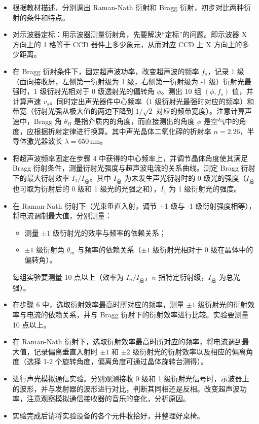 \documentclass[12pt,a4paper,UTF8]{ctexart}
\begin{document}
	\begin{itemize}
		\item 根据教材描述，分别调出 Raman-Nath 衍射和 Bragg 衍射，初步对比两种衍射的条件和特点。
		
		\item 对示波器定标：用示波器测量衍射角，先要解决“定标”的问题。即示波器 X 方向上的 1 格等于 CCD 器件上多少象元，从而对应 CCD 上 X 方向上的多少距离。
		
		\item 在 Bragg 衍射条件下，固定超声波功率，改变超声波的频率 \( f_s \)，记录 1 级（面向接收屏，左侧第一衍射级为 1 级，右侧第一衍射级为 -1 级）衍射光最强时，1 级衍射光相对于 0 级透射光的偏转角 \(\phi\)。测出 10 组 \( (\phi, f_s) \) 值，并计算声速 \( v_s \)。同时定出声光器件中心频率（1 级衍射光最强时对应的频率）和带宽（衍射光强从极大值的两边下降到 \( 1/\sqrt{2} \) 对应的频带宽度）。注意计算声速中，Bragg 角 \( \theta_B \) 是指介质内的角度，而直接测出的角度 \( \phi \) 是空气中的角度，应根据折射定律进行换算。其中声光晶体二氧化碲的折射率 \( n = 2.26 \)，半导体激光器波长 \( \lambda = 650\,\text{nm} \)。
		
		\item 将超声波频率固定在步骤 4 中获得的中心频率上，并调节晶体角度使其满足 Bragg 衍射条件，测量衍射光强度与超声波电流的关系曲线。测定 Bragg 衍射下的最大衍射效率 \( I_1/I_{\text{总}} \)。其中 \( I_{\text{总}} \) 为未发生声光衍射时的 0 级光的强度（\( I_{\text{总}} \) 也可取为衍射后的 0 级和 1 级光的光强之和），\( I_1 \) 为 1 级衍射光的强度。
		
		\item 在 Raman-Nath 衍射下（光束垂直入射，调节 +1 级与 -1 级衍射强度相等），将电流调制最大值，分别测量：
		
		\begin{itemize}
			\item 测量 \( \pm 1 \) 级衍射光的效率与频率的依赖关系；
			\item \( \pm 1 \) 级衍射角 \( \theta_m \) 与频率的依赖关系（\( \pm 1 \) 级衍射光相对于 0 级在晶体中的偏转角）。
		\end{itemize}

		每组实验要测量 10 点以上（效率为 \( I_n/I_{\text{总}} \)，\( n \) 指特定衍射级，\( I_{\text{总}} \) 为总光强）。
		
		\item 在步骤 6 中，选取衍射效率最高时所对应的频率，测量 \( \pm 1 \) 级衍射光的衍射效率与电流的依赖关系，并与 Bragg 衍射下的衍射效率进行比较。实验要测量 10 点以上。
		
		\item 在 Raman-Nath 衍射下，选取衍射效率最高时所对应的频率，将电流调到最大值，记录偏离垂直入射时 \( \pm 1 \) 和 \( \pm 2 \) 级衍射光的衍射效率以及相应的偏离角度（选择 1-2 个旋转角度，偏离角度可通过晶体旋转台测得）。
		
		\item 进行声光模拟通信实验。分别观测接收 0 级和 1 级衍射光信号时，示波器上的波形，并与发射器的波形进行对比，判断其同相还是反相。改变超声波功率，注意观察模拟通信接收器的音乐的变化，分析原因。
		
		\item 实验完成后请将实验设备的各个元件收拾好，并整理好桌椅。
	\end{itemize}
\end{document}
